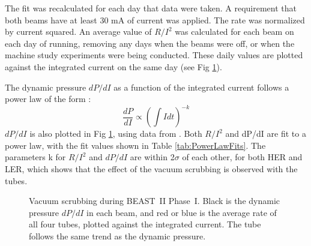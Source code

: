 The fit was recalculated for each day that data were taken. A requirement that both beams have at least 30 mA of current was applied. The rate was normalized by current squared. An average value of $R/I^2$ was calculated for each beam on each day of running, removing any days when the beams were off, or when the machine study experiments were being conducted. These daily values are plotted against the integrated current on the same day (see Fig \ref{fig:VacScrb}).

	The dynamic pressure $dP/dI$ as a function of the integrated current follows a power law of the form \cite{chao2013handbook}:
\begin{equation}
	{\frac{dP}{dI}\propto \left(\int{Idt}\right)^{-k}}
\end{equation}
$dP/dI$ is also plotted in Fig \ref{fig:VacScrb}, using data from \cite{SKBVacuum}. Both $R/I^2$ and dP/dI are fit to a power law, with the fit values shown in Table \ref{tab:PowerLawFits}. The parameters k for $R/I^2$ and $dP/dI$ are within 2$\sigma$ of each other, for both HER and LER, which shows that the effect of the vacuum scrubbing is observed with the \he tubes.


\begin{figure}
	\centering
	\caption[Vacuum scrubbing during BEAST~II Phase~I]{Vacuum scrubbing during BEAST~II Phase~I. Black is the dynamic pressure $dP/dI$ in each beam, and red or blue is the average rate of all four \he tubes, plotted against the integrated current. The \he tube follows the same trend as the dynamic pressure.}	
	\label{fig:VacScrb}
\end{figure}

